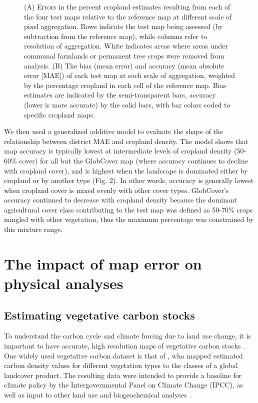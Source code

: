 \documentclass{pnastwo2}
\begin{document}
\begin{article}
\begin{figure}[hb]
\vspace{-0.15 cm}
\caption{(A) Errors in the percent cropland estimates resulting from each of the four test maps relative to the reference map at different scale of pixel aggregation. Rows indicate the test map being assessed (by subtraction from the reference map), while columns refer to resolution of aggregation. White indicates areas where areas under communal farmlands or permanent tree crops were removed from analysis. (B) The bias (mean error) and accuracy (mean absolute error [MAE]) of each test map at each scale of aggregation, weighted by the percentage cropland in each cell of the reference map. Bias estimates are indicated by the semi-transparent bars, accuracy (lower is more accurate) by the solid bars, with bar colors coded to specific cropland maps.}
\label{afoto1}
\end{figure}

We then used a generalized additive model to evaluate the shape of the relationship between district MAE and cropland density. The model shows that map accuracy is typically lowest at intermediate levels of cropland density (50-60\% cover) for all but the GlobCover map (where accuracy continues to decline with cropland cover), and is highest when the landscape is dominated either by cropland or by another type (Fig. 2). In other words, accuracy is generally lowest when cropland cover is mixed evenly with other cover types. GlobCover's accuracy continued to decrease with cropland density because the dominant agricultural cover class contributing to the test map was defined as 50-70\% crops mingled with other vegetation, thus the maximum percentage was constrained by this mixture range.  

\section{The impact of map error on physical analyses}
\subsection{Estimating vegetative carbon stocks}
To understand the carbon cycle and climate forcing due to land use change, it is important to have accurate, high resolution maps of vegetative carbon stocks \cite[][]{searchinger_high_2015}. One widely used vegetative carbon dataset is that of \cite{ruesch_new_2008}, who mapped estimated carbon density values for different vegetation types to the classes of a global landcover product. The resulting data were intended to provide a baseline for climate policy by the Intergovernmental Panel on Climate Change (IPCC), as well as input to other land use and biogeochemical analyses \cite{ruesch_new_2008}. 


\end{article}
\end{document}
